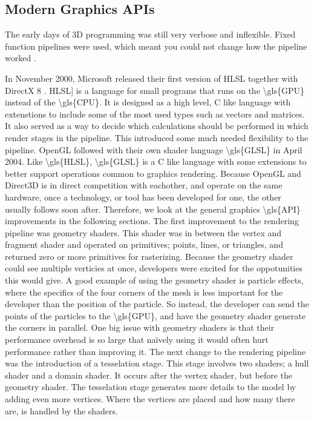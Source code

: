 \subsection{Modern Graphics \acs{API}s}

The early days of 3D programming was still very verbose and inflexible. 
Fixed function pipelines were used, which meant you could not change how the pipeline worked \cite{davidovic2014fixedfunction}.

In November 2000, Microsoft released their first version of \gls{HLSL} together with DirectX 8 \cite{wikipedia????directx}.
\Gls{HLSL] is a language for small programs that runs on the \gls{GPU} instead of the \gls{CPU}.
It is designed as a high level, C like language with extenstions to include some of the most used types such as vectors and matrices.
It also served as a way to decide which calculations should be performed in which render stages in the pipeline.
This introduced some much needed flexibility to the pipeline.

OpenGL followed with their own shader language \gls{GLSL} in April 2004.
Like \gls{HLSL}, \gls{GLSL} is a C like language with some extensions to better support operations common to graphics rendering.

Because OpenGL and Direct3D is in direct competition with eachother, and operate on the same hardware, once a technology, or tool has been developed for one, the other usually follows soon after.
Therefore, we look at the general graphics \gls{API} improvements in the following sections.

The first improvement to the rendering pipeline was geometry shaders.
This shader was in between the vertex and fragment shader and operated on primitives; points, lines, or triangles, and returned zero or more primitives for rasterizing.
Because the geometry shader could see multiple verticies at once, developers were excited for the oppotunities this would give.
A good example of using the geometry shader is particle effects, where the specifics of the four corners of the mesh is less important for the developer than the position of the particle.
So instead, the developer can send the points of the particles to the \gls{GPU}, and have the geometry shader generate the corners in parallel.
One big issue with geometry shaders is that their performance overhead is so large that naïvely using it would often hurt performance rather than improving it.

The next change to the rendering pipeline was the introduction of a tesselation stage.
This stage involves two shaders; a hull shader and a domain shader.
It occurs after the vertex shader, but before the geometry shader.
The tesselation stage generates more details to the model by adding even more vertices.
Where the vertices are placed and how many there are, is handled by the shaders.

}
